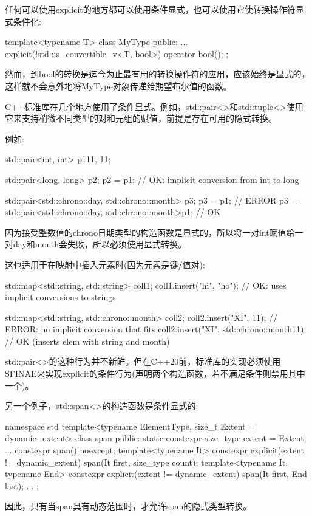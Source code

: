 任何可以使用explicit的地方都可以使用条件显式，也可以使用它使转换操作符显式条件化:

\begin{cpp}
template<typename T>
class MyType {
	public:
	...
	explicit(!std::is_convertible_v<T, bool>) operator bool();
};
\end{cpp}

然而，到bool的转换是迄今为止最有用的转换操作符的应用，应该始终是显式的，这样就不会意外地将MyType对象传递给期望布尔值的函数。


C++标准库在几个地方使用了条件显式。例如，std::pair<>和std::tuple<>使用它来支持稍微不同类型的对和元组的赋值，前提是存在可用的隐式转换。

例如:

\begin{cpp}
std::pair<int, int> p1{11, 11};

std::pair<long, long> p2{};
p2 = p1; // OK: implicit conversion from int to long

std::pair<std::chrono::day, std::chrono::month> p3{};
p3 = p1; // ERROR
p3 = std::pair<std::chrono::day, std::chrono::month>{p1}; // OK
\end{cpp}

因为接受整数值的chrono日期类型的构造函数是显式的，所以将一对int赋值给一对day和month会失败，所以必须使用显式转换。

这也适用于在映射中插入元素时(因为元素是键/值对):

\begin{cpp}
std::map<std::string, std::string> coll1;
coll1.insert({"hi", "ho"}); // OK: uses implicit conversions to strings

std::map<std::string, std::chrono::month> coll2;
coll2.insert({"XI", 11}); // ERROR: no implicit conversion that fits
coll2.insert({"XI", std::chrono::month{11}}); // OK (inserts elem with string and month)
\end{cpp}

std::pair<>的这种行为并不新鲜。但在C++20前，标准库的实现必须使用SFINAE来实现explicit的条件行为(声明两个构造函数，若不满足条件则禁用其中一个)。

另一个例子，std::span<>的构造函数是条件显式的:

\begin{cpp}
namespace std {
	template<typename ElementType, size_t Extent = dynamic_extent>
	class span {
	public:
		static constexpr size_type extent = Extent;
		...
		constexpr span() noexcept;
		template<typename It>
			constexpr explicit(extent != dynamic_extent)
			span(It first, size_type count);
		template<typename It, typename End>
			constexpr explicit(extent != dynamic_extent)
			span(It first, End last);
		...
	};
}
\end{cpp}

因此，只有当span具有动态范围时，才允许span的隐式类型转换。











